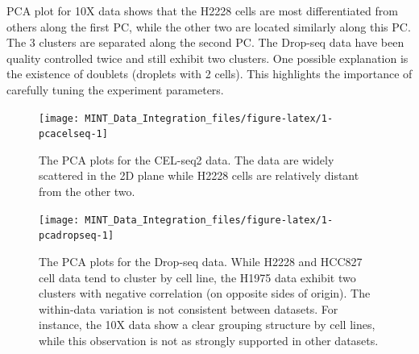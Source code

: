 \documentclass[]{book}
\newenvironment{Shaded}{\begin{snugshade}}{\end{snugshade}}
\newcommand{\CommentTok}[1]{\textcolor[rgb]{0.56,0.35,0.01}{\textit{#1}}}
\newcommand{\DataTypeTok}[1]{\textcolor[rgb]{0.13,0.29,0.53}{#1}}
\newcommand{\KeywordTok}[1]{\textcolor[rgb]{0.13,0.29,0.53}{\textbf{#1}}}
\newcommand{\NormalTok}[1]{#1}
\newcommand{\OperatorTok}[1]{\textcolor[rgb]{0.81,0.36,0.00}{\textbf{#1}}}
\newcommand{\OtherTok}[1]{\textcolor[rgb]{0.56,0.35,0.01}{#1}}
\newcommand{\StringTok}[1]{\textcolor[rgb]{0.31,0.60,0.02}{#1}}
\theoremstyle{definition}
\theoremstyle{definition}
\theoremstyle{definition}
\theoremstyle{remark}
\begin{document}
PCA plot for 10X data shows that the H2228 cells are most differentiated
from others along the first PC, while the other two are located
similarly along this PC. The 3 clusters are separated along the second
PC. The Drop-seq data have been quality controlled twice and still
exhibit two clusters. One possible explanation is the existence of
doublets (droplets with 2 cells). This highlights the importance of
carefully tuning the experiment parameters.

\begin{Shaded}
\end{Shaded}

\begin{figure}[ht]

{\centering \texttt{[image: MINT\_Data\_Integration\_files/figure-latex/1-pcacelseq-1]} 

}

\caption{The PCA plots for the CEL-seq2 data. The data are widely scattered in the 2D plane while H2228 cells are relatively distant from the other two.}\label{fig:1-pcacelseq}
\end{figure}

\begin{Shaded}
\end{Shaded}

\begin{figure}[ht]

{\centering \texttt{[image: MINT\_Data\_Integration\_files/figure-latex/1-pcadropseq-1]} 

}

\caption{The PCA plots for the Drop-seq data. While H2228 and HCC827 cell data tend to cluster by cell line, the H1975 data exhibit two clusters with negative correlation (on opposite sides of origin). The within-data variation is not consistent between datasets. For instance, the 10X data show a clear grouping structure by cell lines, while this observation is not as strongly supported in other datasets. }\label{fig:1-pcadropseq}
\end{figure}
\end{document}

